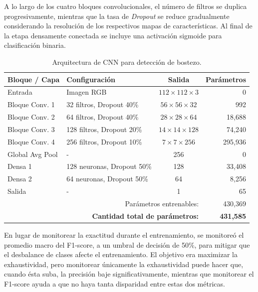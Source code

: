 A lo largo de los cuatro bloques convolucionales, el número de filtros se duplica progresivamente, mientras que la tasa de \textit{Dropout} se reduce gradualmente considerando la resolución de los respectivos mapas de características. Al final de la etapa densamente conectada se incluye una activación sigmoide para clasificación binaria.

\begin{table}[h!]
    \centering
    \small
    \renewcommand{\arraystretch}{1.2}
    \begin{tabular}{llcr}
        \hline
        \textbf{Bloque / Capa} & \textbf{Configuración} & \textbf{Salida} & \textbf{Parámetros} \\
        \hline
        Entrada & Imagen RGB & $112 \times 112 \times 3$ & 0 \\
        \hline
        Bloque Conv. 1 & 32 filtros, Dropout 40\% & $56 \times 56 \times 32$ & 992 \\
        Bloque Conv. 2 & 64 filtros, Dropout 40\% & $28 \times 28 \times 64$ & 18,688 \\
        Bloque Conv. 3 & 128 filtros, Dropout 20\% & $14 \times 14 \times 128$ & 74,240 \\
        Bloque Conv. 4 & 256 filtros, Dropout 10\% & $7 \times 7 \times 256$ & 295,936 \\
        \hline
        Global Avg Pool & - & 256 & 0 \\
        Densa 1 & 128 neuronas, Dropout 50\% & 128 & 33,408 \\
        Densa 2 & 64 neuronas, Dropout 50\% & 64 & 8,256 \\
        Salida & - & 1 & 65 \\
        \hline
        \multicolumn{3}{r}{Parámetros entrenables:} & 430,369 \\
        \hline
        \multicolumn{3}{r}{\textbf{Cantidad total de parámetros:}} & \textbf{431,585} \\
        \hline
    \end{tabular}
    \caption{Arquitectura de CNN para detección de bostezo.}
    \label{tab:tabla CNN yawning}
\end{table}

En lugar de monitorear la exactitud durante el entrenamiento, se monitoreó el promedio macro del F1-score, a un umbral de decisión de 50\%, para mitigar que el desbalance de clases afecte el entrenamiento. El objetivo era maximizar la exhaustividad, pero monitorear únicamente la exhaustividad puede hacer que, cuando ésta suba, la precisión baje significativamente, mientras que monitorear el F1-score ayuda a que no haya tanta disparidad entre estas dos métricas.

